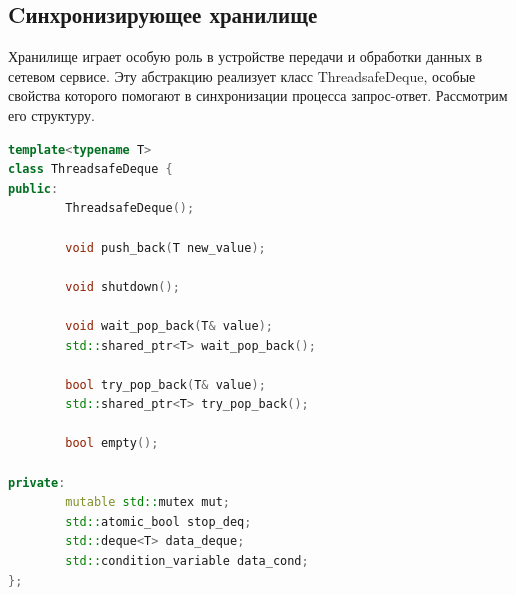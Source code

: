 \documentclass[a4paper, 14pt]{extreport}
\begin{document}
\subsection{Cинхронизирующее хранилище}
\par Хранилище играет особую роль в устройстве передачи и обработки данных в сетевом сервисе. Эту абстракцию реализует класс 
ThreadsafeDeque, особые свойства которого помогают в синхронизации процесса запрос-ответ. Рассмотрим его структуру.
\begin{lstlisting}[language=C++, frame=single, xleftmargin=15pt, caption={Заголовочный файл класса ThreadsafeDeque<T>},label=DescriptiveLabel]
template<typename T>
class ThreadsafeDeque {
public:
        ThreadsafeDeque();

        void push_back(T new_value);

        void shutdown();

        void wait_pop_back(T& value);
        std::shared_ptr<T> wait_pop_back();

        bool try_pop_back(T& value);
        std::shared_ptr<T> try_pop_back();

        bool empty();

private:
        mutable std::mutex mut;
        std::atomic_bool stop_deq;
        std::deque<T> data_deque;
        std::condition_variable data_cond;
};
\end{lstlisting}
\end{document}
